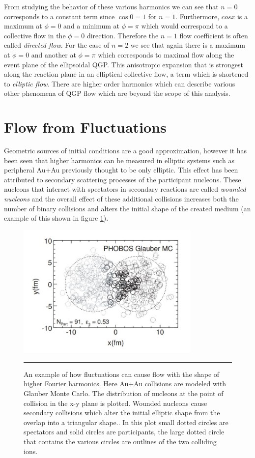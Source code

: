 From studying the behavior of these various harmonics we can see that $n=0$ corresponds to a constant term since $\cos{0} = 1$ for $n=1$. Furthermore, $cos x$ is a maximum at $\phi=0$ and a minimum at $\phi = \pi$ which would correspond to a collective flow in the $\phi=0$ direction. Therefore the $n=1$ flow coefficient is often called \textit{directed flow}. For the case of $n=2$ we see that again there is a maximum at $\phi=0$ and another at $\phi=\pi$ which corresponds to maximal flow along the event plane of the ellipsoidal QGP. This anisotropic expansion that is strongest along the reaction plane in an elliptical collective flow, a term which is shortened to \textit{elliptic flow}. There are higher order harmonics which can describe various other phenomena of QGP flow which are beyond the scope of this analysis.

\section{Flow from Fluctuations}
Geometric sources of initial conditions are a good approximation, however it has been seen that higher harmonics can be measured in elliptic systems such as peripheral Au+Au previously thought to be only elliptic\citep{Alver:2010gr}. This effect has been attributed to secondary scattering processes of the participant nucleons. These nucleons that interact with spectators in secondary reactions are called \textit{wounded nucleons} and the overall effect of these additional collisions increases both the number of binary collisions and alters the initial shape of the created medium (an example of this shown in figure \ref{fig:v3inauau}).

\begin{figure}[htbp!]
  \centering
    \includegraphics[width=0.8\textwidth]{prevplots/phobosglauberv3.JPG}
    \rule{35em}{0.5pt}
  \caption[Triangular Flow from Fluctuations.]{An example of how fluctuations can cause flow with the shape of higher Fourier harmonics. Here Au+Au collisions are modeled with Glauber Monte Carlo. The distribution of nucleons at the point of collision in the x-y plane is plotted. Wounded nucleons cause secondary collisions which alter the initial elliptic shape from the overlap into a triangular shape.\citep{Alver:2010gr}. In this plot small dotted circles are spectators and solid circles are participants, the large dotted circle that contains the various circles are outlines of the two colliding ions.}
  \label{fig:v3inauau}
\end{figure}
\pagebreak
\pagebreak
